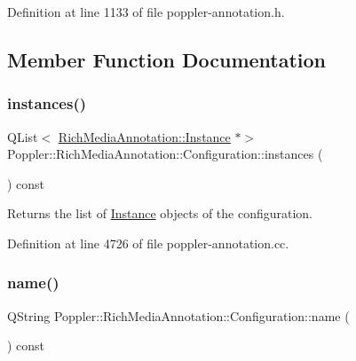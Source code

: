 Definition at line 1133 of file poppler-\/annotation.\+h.



\subsection{Member Function Documentation}
\mbox{\label{class_poppler_1_1_rich_media_annotation_1_1_configuration_ae062ca0d1f67e9a5e2b19c921c72551b}} 
\subsubsection{\texorpdfstring{instances()}{instances()}}
{\footnotesize\ttfamily Q\+List$<$ \hyperlink{class_poppler_1_1_rich_media_annotation_1_1_instance}{Rich\+Media\+Annotation\+::\+Instance} $\ast$$>$ Poppler\+::\+Rich\+Media\+Annotation\+::\+Configuration\+::instances (\begin{DoxyParamCaption}{ }\end{DoxyParamCaption}) const}

Returns the list of \hyperlink{class_poppler_1_1_rich_media_annotation_1_1_instance}{Instance} objects of the configuration. 

Definition at line 4726 of file poppler-\/annotation.\+cc.

\mbox{\label{class_poppler_1_1_rich_media_annotation_1_1_configuration_afc69d02cfa4456428cc397280bdcc5c1}} 
\subsubsection{\texorpdfstring{name()}{name()}}
{\footnotesize\ttfamily Q\+String Poppler\+::\+Rich\+Media\+Annotation\+::\+Configuration\+::name (\begin{DoxyParamCaption}{ }\end{DoxyParamCaption}) const}


